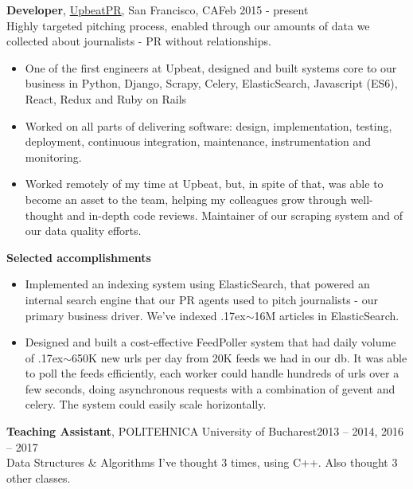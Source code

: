 \documentclass[line, margin]{resume}
\newcommand{\bettertilde}{\raise.17ex\hbox{$\scriptstyle\mathtt{\sim}$}}
\begin{document}
\begin{resume}
\textbf{Developer}, \href{http://upbeatpr.com}{UpbeatPR}, San Francisco, CA\hfill Feb 2015 - present\\
Highly targeted pitching process, enabled through our amounts of data we collected about journalists - PR without relationships.
\begin{itemize} \itemsep -2pt  %
	\item One of the first engineers at Upbeat, designed and built systems core to our business in Python, Django, Scrapy, Celery, ElasticSearch, Javascript (ES6), React, Redux and Ruby on Rails
    \item Worked on all parts of delivering software: design, implementation, testing, deployment, continuous integration, maintenance, instrumentation and monitoring.
	\item Worked remotely  of my time at Upbeat, but, in spite of that, was able to become an asset to the team, helping my colleagues grow through well-thought and in-depth code reviews. Maintainer of our scraping system and of our data quality efforts.
\end{itemize}\vspace{-2.5mm}
\textbf{Selected accomplishments}
\begin{itemize} \itemsep -2pt  %
	\item Implemented an indexing system using ElasticSearch, that powered an internal search engine that our PR agents used to pitch journalists - our primary business driver. We've indexed \bettertilde16M articles in ElasticSearch.
	\item Designed and built a cost-effective FeedPoller system that had daily volume of \bettertilde650K new urls per day from 20K feeds we had in our db. It was able to poll the feeds efficiently, each worker could handle hundreds of urls over a few seconds, doing asynchronous requests with a combination of gevent and celery. The system could easily scale horizontally.
\end{itemize}

\textbf{Teaching Assistant}, POLITEHNICA University of Bucharest\hfill 2013 -- 2014, 2016 -- 2017\\
Data Structures \& Algorithms I've thought 3 times, using C++. Also thought 3 other classes.


\end{resume}
\end{document}
